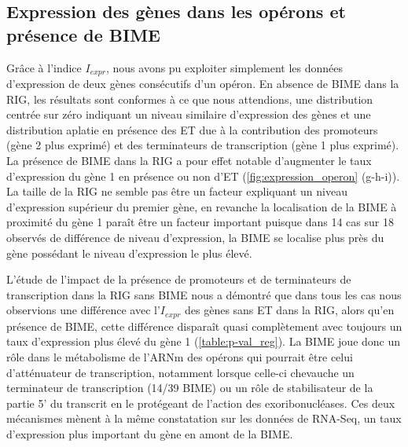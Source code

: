 \documentclass[12pt,a4paper]{report}
\begin{document}
\begin{onehalfspace}
\section*{Expression des gènes dans les opérons et présence de BIME}

Grâce à l'indice $I_{expr}$, nous avons pu exploiter simplement les données d'expression de deux gènes consécutifs d'un opéron. En absence de BIME dans la RIG, les résultats sont conformes à ce que nous attendions, une distribution centrée sur zéro indiquant un niveau similaire d'expression des gènes et une distribution aplatie en présence des ET due à la contribution des promoteurs (gène 2 plus exprimé) et des terminateurs de transcription (gène 1 plus exprimé). La présence de BIME dans la RIG a pour effet notable d'augmenter le taux d'expression du gène 1 en présence ou non d'ET (\autoref{fig:expression_operon} (g-h-i)). La taille de la RIG ne semble pas être un facteur expliquant un niveau d'expression supérieur du premier gène, en revanche la localisation de la BIME à proximité du gène 1 paraît être un facteur important puisque dans 14 cas sur 18 observés de différence de niveau d'expression, la BIME se localise plus près du gène possédant le niveau d'expression le plus élevé.

L'étude de l'impact de la présence de promoteurs et de terminateurs de transcription dans la RIG sans BIME nous a démontré que dans tous les cas nous observions une différence avec l'$I_{expr}$ des gènes sans ET dans la RIG, alors qu'en présence de BIME, cette différence disparaît quasi complètement avec toujours un taux d'expression plus élevé du gène 1 (\autoref{table:p-val_reg}). La BIME joue donc un rôle dans le métabolisme de l'ARNm des opérons qui pourrait être celui d'atténuateur de transcription, notamment lorsque celle-ci chevauche un terminateur de transcription (14/39 BIME) ou un rôle de stabilisateur de la partie 5' du transcrit en le protégeant de l'action des exoribonucléases. Ces deux mécanismes mènent à la même constatation sur les données de RNA-Seq, un taux d'expression plus important du gène en amont de la BIME.


\end{onehalfspace}
\end{document}
